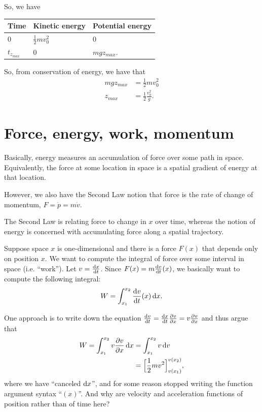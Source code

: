 \begin{enumerate}
  So, we have\\
  \begin{tabular}{l|l|l|}
    Time         & Kinetic energy      & Potential energy \\
    \hline
    $0$          & $\frac{1}{2}mv_0^2$ & 0\\
    $t_{z_{max}}$ & $0$                 & $mgz_{max}$.
  \end{tabular}

  So, from conservation of energy, we have that
  \begin{align*}
    mgz_{max}         &= \frac{1}{2}mv_0^2  \\
    z_{max}           &= \frac{1}{2}\frac{v_0^2}{g}.
  \end{align*}



\end{enumerate}



\section{Force, energy, work, momentum}

Basically, energy measures an accumulation of force over some path in space. Equivalently, the force
at some location in space is a spatial gradient of energy at that location.

However, we also have the Second Law notion that force is the rate of change of momentum,
$F = \dot{p} = m\dot{v}$.

The Second Law is relating force to change in $x$ over time, whereas the notion of energy is
concerned with accumulating force along a spatial trajectory.

Suppose space $x$ is one-dimensional and there is a force $F(x)$ that depends only on position
$x$. We want to compute the integral of force over some interval in space (i.e. ``work''). Let
$v = \dxdt$. Since $F(x) = m\dvdt(x)$, we basically want to compute the following integral:
\begin{align*}
  W = \int_{x_1}^{x_2} \dvdt(x) \dx.
\end{align*}

One approach is to write down the equation $\dvdt = \dxdt \dvdx = v\dvdx$ and thus argue that
\begin{align*}
  W
  = \int_{x_1}^{x_2} v\dvdx \dx
  &= \int_{x_1}^{x_2} v\d v \\
  &= \Big[\frac{1}{2}mv^2\Big]_{v(x_1)}^{v(x_2)},
\end{align*}
where we have ``canceled $\dx$'', and for some reason stopped writing the function argument syntax
``$(x)$''. And why are velocity and acceleration functions of position rather than of time here?

